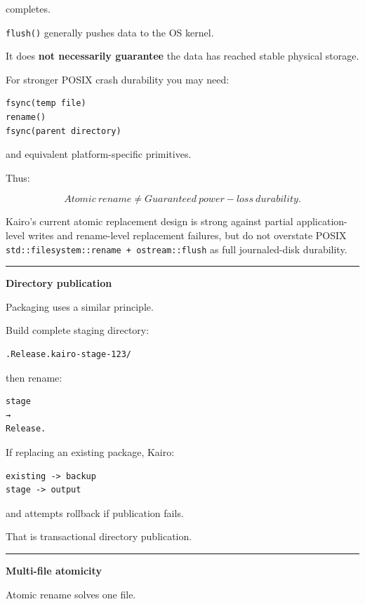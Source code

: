 completes.

\texttt{flush()} generally pushes data to the OS kernel.

It does \textbf{not necessarily guarantee} the data has reached stable physical storage.

For stronger POSIX crash durability you may need:

\begin{verbatim}
fsync(temp file)
rename()
fsync(parent directory)
\end{verbatim}

and equivalent platform-specific primitives.

Thus:

\[
\boxed{
Atomic\ rename
\neq
Guaranteed\ power-loss\ durability.
}
\]

Kairo's current atomic replacement design is strong against partial application-level writes and rename-level replacement failures, but do not overstate POSIX \texttt{std::filesystem::rename\ +\ ostream::flush} as full journaled-disk durability.

\begin{center}\rule{0.5\linewidth}{0.5pt}\end{center}

\textbf{Directory publication}

Packaging uses a similar principle.

Build complete staging directory:

\begin{verbatim}
.Release.kairo-stage-123/
\end{verbatim}

then rename:

\begin{verbatim}
stage
→
Release.
\end{verbatim}

If replacing an existing package, Kairo:

\begin{verbatim}
existing -> backup
stage -> output
\end{verbatim}

and attempts rollback if publication fails.

That is transactional directory publication.

\begin{center}\rule{0.5\linewidth}{0.5pt}\end{center}

\textbf{Multi-file atomicity}

Atomic rename solves one file.

